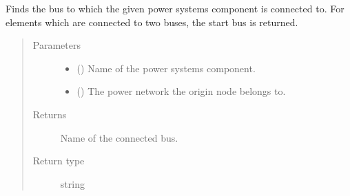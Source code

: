 \documentclass[letterpaper,10pt,english]{sphinxmanual}
\begin{document}
\begin{fulllineitems}
\label{\detokenize{apidoc:dreaminsg_integrated_model.src.network_sim_models.interdependencies.find_connected_power_node}}
\sphinxAtStartPar
Finds the bus to which the given power systems component is connected to. For elements which are connected to two buses, the start bus is returned.
\begin{quote}\begin{description}
\item[{Parameters}] \leavevmode\begin{itemize}
\item {} 
\sphinxAtStartPar
{} () \textendash{} Name of the power systems component.

\item {} 
\sphinxAtStartPar
{} () \textendash{} The power network the origin node belongs to.

\end{itemize}

\item[{Returns}] \leavevmode
\sphinxAtStartPar
Name of the connected bus.

\item[{Return type}] \leavevmode
\sphinxAtStartPar
string

\end{description}\end{quote}

\end{fulllineitems}

\end{document}
